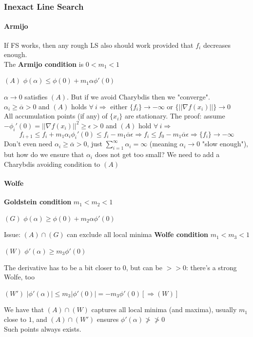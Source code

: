 \documentclass[10pt]{report}
\begin{document}
\subsubsection{Inexact Line Search}
\paragraph{Armijo} If FS works, then any rough LS also should work provided that $f_i$ decreases enough.\\
The \textbf{Armijo condition} is $0 < m_1 < 1$
\begin{list}{}{}
	\item[$(A)$] $\phi(\alpha)\leq \phi(0)+m_1\alpha\phi'(0)$
\end{list}
$\alpha \rightarrow 0$ satisfies $(A)$. But if we avoid Charybdis then we "converge".\\
$\alpha_i\geq \overline{\alpha} > 0$ and $(A)$ holds $\forall\:i\Rightarrow$ either $\{f_i\}\rightarrow -\infty$ or $\{||\nabla f(x_i)||\}\rightarrow 0$\\
All accumulation points (if any) of $\{x_i\}$ are stationary. The proof: assume $-\phi_i'(0) = ||\nabla f(x_i)||^2\geq \epsilon > 0$ and $(A)$ hold $\forall\:i\Rightarrow$ $$f_{i+1} \leq f_i + m_1\alpha_i\phi_i'(0)\leq f_i - m_1\overline{\alpha}\epsilon \Rightarrow f_i \leq f_0 - m_1\overline{\alpha}\epsilon \Rightarrow \{f_i\}\rightarrow -\infty$$ Don't even need $\alpha_i\geq \overline{\alpha} > 0$, just $\sum_{i=1}^\infty \alpha_i = \infty$ (meaning $\alpha_i\rightarrow 0$ "slow enough"), but how do we ensure that $\alpha_i$ does not get too small? We need to add a Charybdis avoiding condition to $(A)$
\paragraph{Wolfe} \textbf{Goldstein condition} $m_1 < m_2 < 1$
\begin{list}{}{}
	\item[$(G)$] $\phi(\alpha)\geq \phi(0) + m_2\alpha\phi'(0)$
\end{list}
Issue: $(A)\cap (G)$ can exclude all local minima
\textbf{Wolfe condition} $m_1 < m_3 < 1$
\begin{list}{}{}
	\item[$(W)$] $\phi'(\alpha)\geq m_3\phi'(0)$
\end{list}
The derivative has to be a bit closer to $0$, but can be $>>0$: there's a strong Wolfe, too
\begin{list}{}{}
	\item[$(W')$] $|\phi'(\alpha)|\leq m_3|\phi'(0)| = -m_3\phi'(0) [\Rightarrow (W)]$
\end{list}
We have that $(A)\cap (W)$ captures all local minima (and maxima), usually $m_1$ close to $1$, and $(A)\cap(W')$ ensures $\phi'(\alpha) \not >\not >0$\\
Such points always exists.
\end{document}
